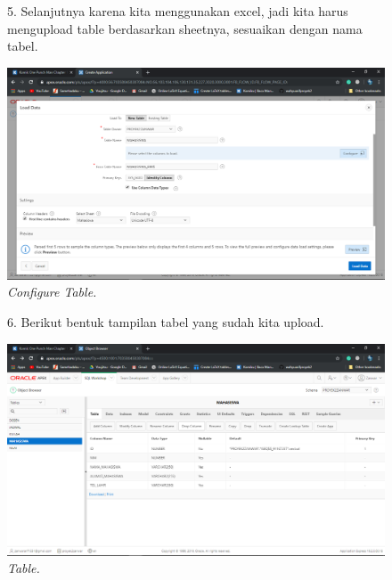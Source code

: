 \begin{enumerate}
    \begin{figure}[!htbp]
    \item[5.] Selanjutnya karena kita menggunakan excel, jadi kita harus mengupload table berdasarkan sheetnya, sesuaikan dengan nama tabel.
    \begin{center}
    \includegraphics[scale=0.3]{figures/Screenshot(120).png}
    \caption{\textit{Configure Table.}}
    \end{center}   
    \end{figure}
    
    \begin{figure}[!htbp]
    \item[6.] Berikut bentuk tampilan tabel yang sudah kita upload.
    \begin{center}
    \includegraphics[scale=0.3]{figures/Screenshot(122).png}
    \caption{\textit{Table.}}
    \end{center}   
    \end{figure}
    

\end{enumerate}
